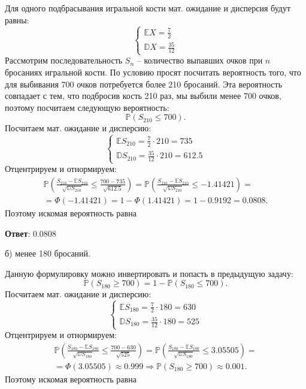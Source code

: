 \documentclass{article}
\begin{document}
\begin{enumerate}
Для одного подбрасывания игральной кости мат. ожидание и дисперсия будут равны:
\begin{equation}
  \begin{cases}
    \mathbb{E}X = \frac{7}{2} \\
    \mathbb{D}X = \frac{35}{12}
  \end{cases}
\end{equation}
Рассмотрим последовательность $S_n$ -- количество выпавших очков при $n$ бросаниях игральной кости. По условию просят посчитать вероятность того, что для выбивания 700 очков потребуется более 210 бросаний. Эта вероятность совпадает с тем, что подбросив кость 210 раз, мы выбили менее 700 очков, поэтому посчитаем следующую вероятность:
\begin{equation}
  \mathbb{P}(S_{210} \leq 700).
\end{equation}
Посчитаем мат. ожидание и дисперсию:
\begin{equation}
  \begin{cases}
    \mathbb{E}S_{210} = \frac{7}{2} \cdot 210 = 735\\
    \mathbb{D}S_{210} = \frac{35}{12} \cdot 210 = 612.5
  \end{cases}
\end{equation}
Отцентрируем и отнормируем:
\begin{eqnarray}
  \mathbb{P}\left(\frac{S_{210} - \mathbb{E}S_{210}}{\sqrt{\mathbb{D}S_{210}}} \leq \frac{700 - 735}{\sqrt{612.5}}\right) = \mathbb{P}\left(\frac{S_{210} - \mathbb{E}S_{210}}{\sqrt{\mathbb{D}S_{210}}} \leq -1.41421\right) = \\ = \Phi(-1.41421) = 1 - \Phi(1.41421) = 1 - 0.9192 = 0.0808.
\end{eqnarray}
Поэтому искомая вероятность равна

\textbf{Ответ}: 0.0808

б) менее 180 бросаний.

Данную формулировку можно инвертировать и попасть в предыдущую задачу:
\begin{equation}
  \mathbb{P}(S_{180} \geq 700) = 1 - \mathbb{P}(S_{180} \leq 700).
\end{equation}
Посчитаем мат. ожидание и дисперсию:
\begin{equation}
  \begin{cases}
    \mathbb{E}S_{180} = \frac{7}{2} \cdot 180 = 630\\
    \mathbb{D}S_{180} = \frac{35}{12} \cdot 180 = 525
  \end{cases}
\end{equation}
Отцентрируем и отнормируем:
\begin{eqnarray}
  \mathbb{P}\left(\frac{S_{180} - \mathbb{E}S_{180}}{\sqrt{\mathbb{D}S_{180}}} \leq \frac{700 - 630}{\sqrt{525}}\right) = \mathbb{P}\left(\frac{S_{180} - \mathbb{E}S_{180}}{\sqrt{\mathbb{D}S_{180}}} \leq 3.05505\right) = \\ = \Phi(3.05505) \approx 0.999 \Rightarrow \mathbb{P}(S_{180} \geq 700) \approx 0.001.
\end{eqnarray}
Поэтому искомая вероятность равна


\end{enumerate}
\end{document}
